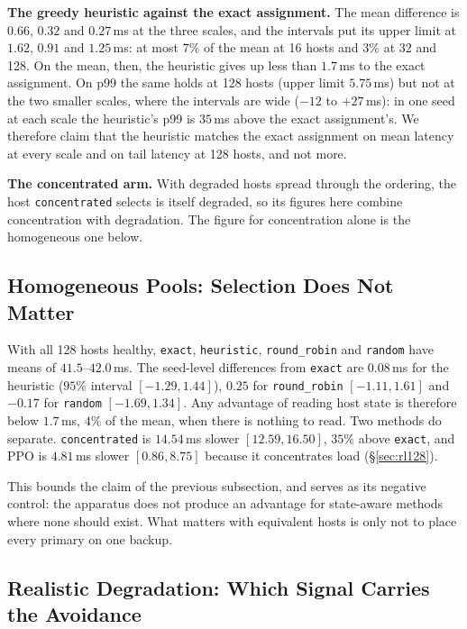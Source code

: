 \textbf{The greedy heuristic against the exact assignment.} The mean difference
is $0.66$, $0.32$ and $0.27$\,ms at the three scales, and the intervals put its
upper limit at $1.62$, $0.91$ and $1.25$\,ms: at most $7\%$ of the mean at 16
hosts and $3\%$ at 32 and 128. On the mean, then, the heuristic gives up less
than $1.7$\,ms to the exact assignment. On p99 the same holds at 128 hosts
(upper limit $5.75$\,ms) but not at the two smaller scales, where the intervals
are wide ($-12$ to $+27$\,ms): in one seed at each scale the heuristic's p99 is
$35$\,ms above the exact assignment's. We therefore claim
that the heuristic matches the exact assignment on mean latency at every scale
and on tail latency at 128 hosts, and not more.

\textbf{The concentrated arm.} With degraded hosts spread through the ordering,
the host \texttt{concentrated} selects is itself degraded, so its figures here
combine concentration with degradation. The figure for concentration alone is
the homogeneous one below.

\subsection{Homogeneous Pools: Selection Does Not Matter}
\label{sec:homog}

With all 128 hosts healthy, \texttt{exact}, \texttt{heuristic},
\texttt{round\_robin} and \texttt{random} have means of $41.5$--$42.0$\,ms. The
seed-level differences from \texttt{exact} are $0.08$\,ms for the heuristic
($95\%$ interval $[-1.29, 1.44]$), $0.25$ for \texttt{round\_robin}
$[-1.11, 1.61]$ and $-0.17$ for \texttt{random} $[-1.69, 1.34]$. Any advantage
of reading host state is therefore below $1.7$\,ms, $4\%$ of the mean, when
there is nothing to read. Two methods do separate. \texttt{concentrated} is
$14.54$\,ms slower $[12.59, 16.50]$, $35\%$ above \texttt{exact}, and PPO is
$4.81$\,ms slower $[0.86, 8.75]$ because it concentrates load
(\S\ref{sec:rl128}).

This bounds the claim of the previous subsection, and serves as its negative
control: the apparatus does not produce an advantage for state-aware methods
where none should exist. What matters with equivalent hosts is only not to place
every primary on one backup.

\subsection{Realistic Degradation: Which Signal Carries the Avoidance}
\label{sec:weights}

